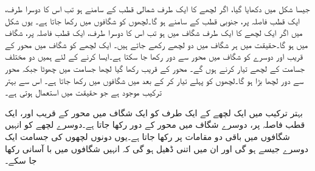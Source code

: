 جیسا شکل  میں دکھایا گیا، اگر لچھے کا ایک طرف شمالی قطب کے سامنے ہو تب اس کا دوسرا طرف، ایک قطب فاصلہ پر، جنوبی قطب کے سامنے ہو گا۔لچھوں کو شگافوں میں رکھا جاتا ہے۔ یوں شکل  میں اگر ایک لچھے کا ایک طرف شگاف  میں ہو تب اس کا دوسرا طرف، ایک قطب فاصلہ پر، شگاف  میں ہو گا۔حقیقت میں ہر شگاف میں دو لچھے رکھے جاتے ہیں۔ ایک لچھے کو شگاف میں محور کے قریب اور دوسرے کو شگاف میں محور سے دور رکھا جا سکتا ہے۔ایسا کرنے کے لئے ہمیں دو مختلف جسامت کے لچھے تیار کرنے ہوں گے۔ محور کے قریب رکھا گیا لچھا جسامت میں چھوٹا جبکہ محور سے دور لچھا بڑا ہو گا۔لچھوں کو پہلے تیار کر کے بعد میں شگافوں میں رکھا جاتا ہے۔ اس سے بہتر ترکیب موجود ہے جو حقیقت میں استعمال ہوتی ہے۔

 بہتر ترکیب میں ایک لچھے کے ایک طرف کو ایک  شگاف میں محور کے قریب اور، ایک قطب فاصلہ پر، دوسرے شگاف میں محور کے دور رکھا جاتا ہے۔دوسرے لچھے کو انہیں شگافوں میں باقی دو مقامات پر رکھا جاتا ہے۔یوں دونوں لچھوں کی جسامت ایک دوسرے جیسے ہو گی اور ان میں اتنی ڈھیل ہو گی کہ انہیں شگافوں میں با آسانی رکھا جا سکے۔

